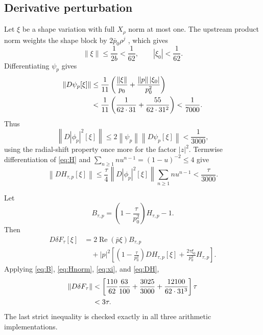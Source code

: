 \documentclass[11pt]{amsart}
\newcommand{\norm}[1]{\left\lVert #1\right\rVert}
\newcommand{\abs}[1]{\left\lvert #1\right\rvert}
\newcommand{\Rea}{\operatorname{Re}}
\begin{document}
\subsection{Derivative perturbation}

Let $\xi$ be a shape variation with full $X_\rho$ norm at most one.  The
upstream product norm weights the shape block by $2\bar p_0\rho^j$
\cite[Validation Specification, Eq.~(13)]{ColbrookStepaniantsCert2026},
which gives
\begin{equation}\label{eq:xi}
  \norm\xi\le\frac1{2b}<\frac1{62},
  \qquad
  \abs{\xi_0}<\frac1{62}.
\end{equation}
Differentiating $\psi_p$ gives
\begin{align}
  \norm{D\psi_p[\xi]}
  &\le\frac1{11}
  \left(\frac{\norm\xi}{p_0}
  +\frac{\norm p\abs{\xi_0}}{p_0^2}\right)\notag\\
  &<\frac1{11}
  \left(\frac1{62\cdot31}
  +\frac{55}{62\cdot31^2}\right)
  <\frac1{7000}.
  \label{eq:Dpsi}
\end{align}
Thus
\begin{equation}\label{eq:DR}
  \norm{D\abs{\phi_p}^2[\xi]}
  \le2\norm{\psi_p}\norm{D\psi_p[\xi]}
  <\frac1{3000},
\end{equation}
using the radial-shift property once more for the factor $\abs z^2$.
Termwise differentiation of \eqref{eq:H} and
$\sum_{n\ge1}nu^{n-1}=(1-u)^{-2}\le4$ give
\begin{equation}\label{eq:DH}
  \norm{DH_{\tau,p}[\xi]}
  \le\frac\tau4\norm{D\abs{\phi_p}^2[\xi]}
  \sum_{n\ge1}nu^{n-1}
  <\frac\tau{3000}.
\end{equation}

Let
\[
  B_{\tau,p}
  =\left(1-\frac\tau{p_0^2}\right)H_{\tau,p}-1.
\]
Then
\begin{align*}
  D\delta F_\tau[\xi]
  &=2\Rea(\bar p\xi)B_{\tau,p}\\
  &\quad+\abs p^2\left[
    \left(1-\frac\tau{p_0^2}\right)DH_{\tau,p}[\xi]
    +\frac{2\tau\xi_0}{p_0^3}H_{\tau,p}
  \right].
\end{align*}
Applying \eqref{eq:B}, \eqref{eq:Hnorm}, \eqref{eq:xi}, and
\eqref{eq:DH},
\begin{align}
  \norm{D\delta F_\tau}
  &<\left[
  \frac{110}{62}\frac{63}{100}
  +\frac{3025}{3000}
  +\frac{12100}{62\cdot31^3}
  \right]\tau\notag\\
  &<3\tau.
  \label{eq:derivative}
\end{align}
The last strict inequality is checked exactly in all three arithmetic
implementations.
\end{document}
